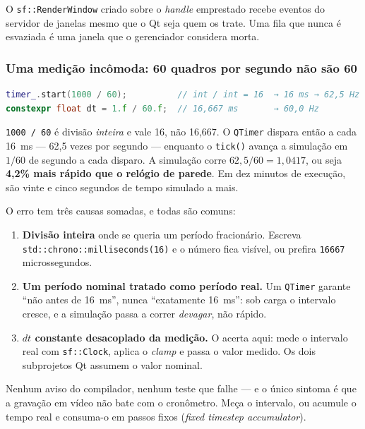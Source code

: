 O \texttt{sf::RenderWindow} criado sobre o \emph{handle} emprestado recebe
eventos do servidor de janelas mesmo que o Qt seja quem os trate. Uma fila que
nunca é esvaziada é uma janela que o gerenciador considera morta.

\subsubsection{Uma medição incômoda: 60 quadros por segundo não são 60}

\begin{lstlisting}[style=bt, language=C++,
    caption={Duas constantes, dois arredondamentos diferentes --- ambos os subprojetos.}]
timer_.start(1000 / 60);          // int / int = 16  → 16 ms → 62,5 Hz
constexpr float dt = 1.f / 60.f;  // 16,667 ms       → 60,0 Hz
\end{lstlisting}

\texttt{1000 / 60} é divisão \emph{inteira} e vale 16, não 16,667. O
\texttt{QTimer} dispara então a cada 16~ms --- 62,5 vezes por segundo --- enquanto
o \texttt{tick()} avança a simulação em $1/60$ de segundo a cada disparo. A
simulação corre $62{,}5/60 = 1{,}0417$, ou seja \textbf{4,2\% mais rápido que o
relógio de parede}. Em dez minutos de execução, são vinte e cinco segundos de
tempo simulado a mais.

\begin{armadilha}
O erro tem três causas somadas, e todas são comuns:
\begin{enumerate}
  \item \textbf{Divisão inteira} onde se queria um período fracionário. Escreva
        \texttt{std::chrono::milliseconds(16)} e o número fica visível, ou
        prefira \texttt{16667} microssegundos.
  \item \textbf{Um período nominal tratado como período real.} Um
        \texttt{QTimer} garante ``não antes de 16~ms'', nunca ``exatamente
        16~ms'': sob carga o intervalo cresce, e a simulação passa a correr
        \emph{devagar}, não rápido.
  \item \textbf{$dt$ constante desacoplado da medição.} O 
        acerta aqui: mede o intervalo real com \texttt{sf::Clock}, aplica o
        \emph{clamp} e passa o valor medido. Os dois subprojetos Qt assumem o
        valor nominal.
\end{enumerate}
Nenhum aviso do compilador, nenhum teste que falhe --- e o único sintoma é que a
gravação em vídeo não bate com o cronômetro. Meça o intervalo, ou acumule o
tempo real e consuma-o em passos fixos (\emph{fixed timestep accumulator}).
\end{armadilha}

